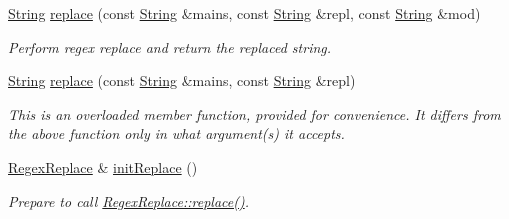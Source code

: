 \begin{DoxyCompactItemize}
\hyperlink{namespacejpcre2_a91f03070152fb228bc116c5a737f1d16}{String} \hyperlink{classjpcre2_1_1Regex_ac592ce7a5e4210ed5f90a0105b1f2981_ac592ce7a5e4210ed5f90a0105b1f2981}{replace} (const \hyperlink{namespacejpcre2_a91f03070152fb228bc116c5a737f1d16}{String} \&mains, const \hyperlink{namespacejpcre2_a91f03070152fb228bc116c5a737f1d16}{String} \&repl, const \hyperlink{namespacejpcre2_a91f03070152fb228bc116c5a737f1d16}{String} \&mod)
\begin{DoxyCompactList}\small\item\em Perform regex replace and return the replaced string. \end{DoxyCompactList}\item 
\hyperlink{namespacejpcre2_a91f03070152fb228bc116c5a737f1d16}{String} \hyperlink{classjpcre2_1_1Regex_addd7c21abd0f4cf6c532a7602cfb5835_addd7c21abd0f4cf6c532a7602cfb5835}{replace} (const \hyperlink{namespacejpcre2_a91f03070152fb228bc116c5a737f1d16}{String} \&mains, const \hyperlink{namespacejpcre2_a91f03070152fb228bc116c5a737f1d16}{String} \&repl)
\begin{DoxyCompactList}\small\item\em This is an overloaded member function, provided for convenience. It differs from the above function only in what argument(s) it accepts. \end{DoxyCompactList}\item 
\hyperlink{classjpcre2_1_1RegexReplace}{Regex\+Replace} \& \hyperlink{classjpcre2_1_1Regex_ae7235a991492fa88f1bd3fb02d59cd0a_ae7235a991492fa88f1bd3fb02d59cd0a}{init\+Replace} ()
\begin{DoxyCompactList}\small\item\em Prepare to call \hyperlink{classjpcre2_1_1RegexReplace_afd087fa7a9bfedec802d1a3dd7edbdd0_afd087fa7a9bfedec802d1a3dd7edbdd0}{Regex\+Replace\+::replace()}. \end{DoxyCompactList}\end{DoxyCompactItemize}
